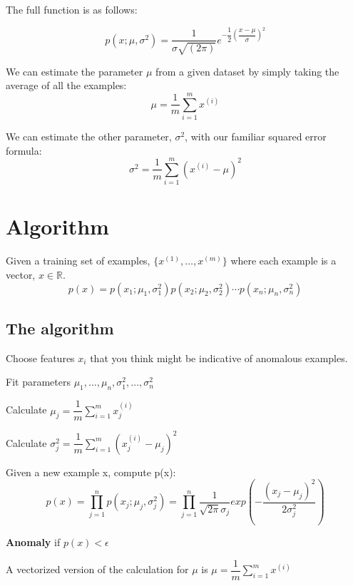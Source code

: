 The full function is as follows:

\begin{equation}
p(x;\mu,\sigma^2) = \dfrac{1}{\sigma\sqrt{(2\pi)}}e^{-\dfrac{1}{2}(\dfrac{x - \mu}{\sigma})^2}
\end{equation}

We can estimate the parameter $\mu$ from a given dataset by simply taking the average of all the examples:
\begin{equation}
\mu = \dfrac{1}{m}\displaystyle \sum_{i=1}^m x^{(i)}
\end{equation}

We can estimate the other parameter, $\sigma^2$, with our familiar squared error formula:
\begin{equation}
\sigma^2 = \dfrac{1}{m}\displaystyle \sum_{i=1}^m(x^{(i)} - \mu)^2
\end{equation}

\section{Algorithm}
Given a training set of examples, $\lbrace x^{(1)},\dots,x^{(m)}\rbrace $ where each example is a vector, $x \in \mathbb{R}$.
\begin{equation}
p(x) = p(x_1;\mu_1,\sigma_1^2)p(x_2;\mu_2,\sigma^2_2)\cdots p(x_n;\mu_n,\sigma^2_n)
\end{equation}

\subsection{The algorithm}
Choose features $x_i$ that you think might be indicative of anomalous examples.

Fit parameters $\mu_1,\dots,\mu_n,\sigma_1^2,\dots,\sigma_n^2$

Calculate $\mu_j = \dfrac{1}{m}\displaystyle \sum_{i=1}^m x_j^{(i)}$

Calculate $\sigma^2_j = \dfrac{1}{m}\displaystyle \sum_{i=1}^m(x_j^{(i)} - \mu_j)^2$

Given a new example x, compute p(x):
\begin{equation}
p(x) = \displaystyle \prod^n_{j=1} p(x_j;\mu_j,\sigma_j^2) = \prod\limits^n_{j=1} \dfrac{1}{\sqrt{2\pi}\sigma_j}exp(-\dfrac{(x_j - \mu_j)^2}{2\sigma^2_j})
\end{equation}

{\bf Anomaly} if $p(x) < \epsilon$

A vectorized version of the calculation for $\mu$ is $\mu = \dfrac{1}{m}\displaystyle \sum_{i=1}^m x^{(i)}$

